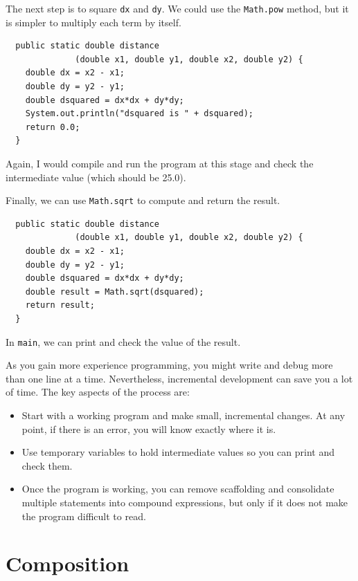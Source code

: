 \documentclass[12pt]{book}
\theoremstyle{exercise}
\begin{document}
The next step is to square {\tt dx} and {\tt dy}.  We could use the
{\tt Math.pow} method, but it is simpler to multiply each term by
itself.

\begin{lstlisting}
  public static double distance
              (double x1, double y1, double x2, double y2) {
    double dx = x2 - x1;
    double dy = y2 - y1;
    double dsquared = dx*dx + dy*dy;
    System.out.println("dsquared is " + dsquared);
    return 0.0;
  }
\end{lstlisting}
%
Again, I would compile and run the program at this stage
and check the intermediate value (which should be 25.0).

Finally, we can use {\tt Math.sqrt} to compute and
return the result.

\begin{lstlisting}
  public static double distance
              (double x1, double y1, double x2, double y2) {
    double dx = x2 - x1;
    double dy = y2 - y1;
    double dsquared = dx*dx + dy*dy;
    double result = Math.sqrt(dsquared);
    return result;
  }
\end{lstlisting}
%
In {\tt main}, we can print and check the value of the result.

As you gain more experience programming, you might
write and debug more than one line at a time.  Nevertheless,
incremental development can save you a lot of time.
%
The key aspects of the process are:

\begin{itemize}

\item Start with a working program and make small, incremental
changes.  At any point, if there is an error, you will know
exactly where it is.

\item Use temporary variables to hold intermediate values so
you can print and check them.

\item Once the program is working, you can remove
scaffolding and consolidate multiple statements into
compound expressions, but only if it does not make the program
difficult to read.

\end{itemize}


\section{Composition}
\end{document}
